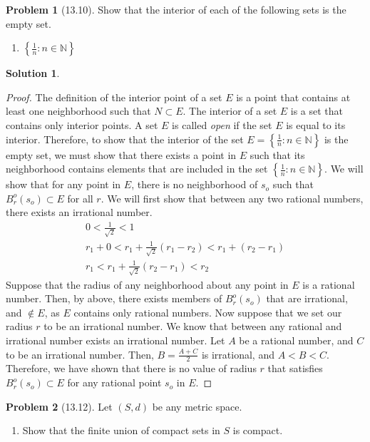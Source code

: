 \documentclass[12pt]{article}
\theoremstyle{definition} %
\newtheorem{solution}{Solution}
\newtheorem{problem}{Problem}
\theoremstyle{plain} %
\begin{document}
\begin{problem}[13.10]
Show that the interior of each of the following sets is the empty set.
\begin{enumerate}
    \item $\left\{ \frac{1}{n}:n\in\mathbb{{N}}  \right\} $ 
\end{enumerate}
\end{problem}

\begin{solution}
   \begin{proof}
    The definition of the interior point of a set $E$ is a point that contains at least one neighborhood such that $N\subset E$. The interior of a set $E$ is a set that contains only interior points. A set $E$ is called \emph{open} if the set $E$ is equal to its interior. Therefore, to show that the interior of the set $E=\left\{ \frac{1}{n}:n\in \mathbb{{N}}  \right\} $ is the empty set, we must show that there exists a point in $E$ such that its neighborhood
    contains elements that are included in the set $\left\{ \frac{1}{n}:n\in\mathbb{{N}}  \right\}$. 
    We will show that for any point in $E$, there is no neighborhood of $s_{o} $ such that $B_{r}^{o}(s_{o} )\subset E $ for all $r$. We will first show that between any two rational numbers, there exists an irrational number.
    \begin{align}
        0<\frac{1}{\sqrt{2} }<1 \\[10pt] 
        r_{1} + 0 < r_{1} + \frac{1}{\sqrt{2} }(r_{1} -r_{2} )<r_{1} +(r_{2} -r_{1} )\\[10pt] 
        r_{1} <r_{1} +\frac{1}{\sqrt{2} }(r_{2} -r_{1} )<r_{2}
    \end{align}
    Suppose that the radius of any neighborhood about any point in $E$ is a rational number. Then, by above, there exists members of $B_{r}^{o}(s_{o} )$ that are irrational, and $\notin E $, as $E$ contains only rational numbers. Now suppose that we set our radius $r$ to be an irrational number. We know that between any rational and irrational number exists an irrational number. Let $A$  be a rational number, and $C$  to be an irrational number. Then, $B=\frac{A+C}{2}$ is irrational, and $A<B<C$. Therefore, we have shown that there is no value of radius $r$ that satisfies $B_{r}^{o}(s_{o} )\subset E$ for any rational point $s_{o} $ in $E$.
   \end{proof} 
\end{solution}

\begin{problem}[13.12]   
Let $(S,d)$ be any metric space.
\begin{enumerate}
    \item Show that the finite union of compact sets in $S$ is compact.
\end{enumerate}
\end{problem}
\end{document}
